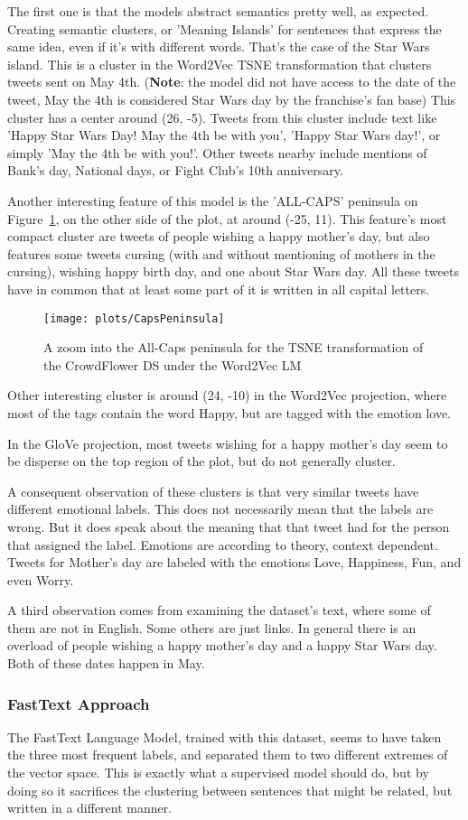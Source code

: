 The first one is that the models abstract semantics pretty well, as expected. Creating semantic clusters, or 'Meaning Islands' for sentences that express the same idea, even if it's with different words. That's the case of the Star Wars island. This is a cluster in the Word2Vec TSNE transformation that clusters tweets sent on May 4th. (\textbf{Note}: the model did not have access to the date of the tweet, May the 4th is considered Star Wars day by the franchise's fan base) This cluster has a center around (26, -5). Tweets from this cluster include text like 'Happy Star Wars Day! May the 4th be with you', 'Happy Star Wars day!', or simply 'May the 4th be with you!'. Other tweets nearby include mentions of Bank's day, National days, or Fight Club's 10th anniversary.

Another interesting feature of this model is the 'ALL-CAPS' peninsula on Figure~\ref{fig:CapsPeninsula}, on the other side of the plot, at around (-25, 11). This feature's most compact cluster are tweets of people wishing a happy mother's day, but also features some tweets cursing (with and without mentioning of mothers in the cursing), wishing happy birth day, and one about Star Wars day. All these tweets have in common that at least some part of it is written in all capital letters.

\begin{figure}[H]
  \texttt{[image: plots/CapsPeninsula]}
  \centering
  \caption{A zoom into the All-Caps peninsula for the TSNE transformation of the CrowdFlower DS under the Word2Vec LM}\label{fig:CapsPeninsula}
\end{figure}

Other interesting cluster is around (24, -10) in the Word2Vec projection, where most of the tags contain the word Happy, but are tagged with the emotion love.

In the GloVe projection, most tweets wishing for a happy mother's day seem to be disperse on the top region of the plot, but do not generally cluster.

A consequent observation of these clusters is that very similar tweets have different emotional labels. This does not necessarily mean that the labels are wrong. But it does speak about the meaning that that tweet had for the person that assigned the label. Emotions are according to theory, context dependent. Tweets for Mother's day are labeled with the emotions Love, Happiness, Fun, and even Worry.

A third observation comes from examining the dataset's text, where some of them are not in English. Some others are just links. In general there is an overload of people wishing a happy mother's day and a happy Star Wars day. Both of these dates happen in May.

\subsubsection{FastText Approach}
The FastText Language Model, trained with this dataset, seems to have taken the three most frequent labels, and separated them to two different extremes of the vector space. This is exactly what a supervised model should do, but by doing so it sacrifices the clustering between sentences that might be related, but written in a different manner.
